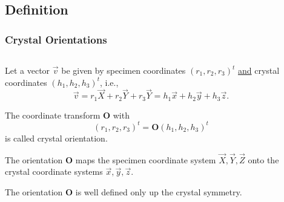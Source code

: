 \documentclass[compress]{beamer}
\begin{document}
\subsection*{Definition}

\begin{frame}
  \frametitle{Crystal Orientations}

  \begin{columns}

    \begin{column}{6.3cm}

      \begin{overlayarea}{6.4cm}{8cm}
        Let a vector $\vec v$ be given by specimen coordinates
        $(r_{1},r_{2},r_{3})^{t}$ \underline{and} crystal coordinates
        $(h_{1},h_{2},h_{3})^{t}$, i.e.,
        \begin{equation*}
          \vec v = r_{1} \vec X + r_{2} \vec Y + r_{3} \vec Y
                 = h_{1} \vec x + h_{2} \vec y + h_{3} \vec z.
        \end{equation*}

        \pause

        The coordinate transform $\mathbf O$ with
      \begin{equation*}
        \left(r_{1},r_{2},r_{3}\right)^{t}
        =
         \mathbf O
         \left(
          h_{1},h_{2},h_{3} \right)^{t}
      \end{equation*}
      is called \alert{crystal orientation}.

      \pause
      \medskip

      The orientation $\mathbf O$ maps the specimen coordinate system $\vec X,
      \vec Y, \vec Z$ onto the crystal coordinate systems $\vec x, \vec y,
      \vec z$.

      \pause
      \medskip

      The orientation $\mathbf O$ is well defined only up the crystal
      symmetry.

    \end{overlayarea}
  \end{column}

    \begin{column}{5cm}

\end{column}
\end{columns}
\end{frame}
\end{document}

